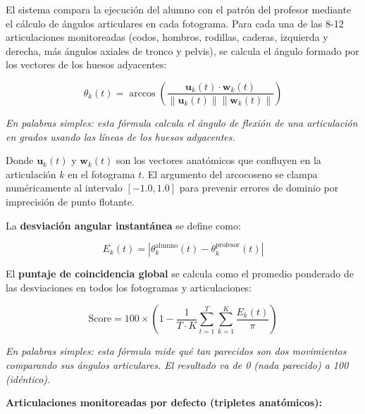 \documentclass[12pt,letterpaper]{article}
\begin{document}
El sistema compara la ejecución del alumno con el patrón del profesor mediante el cálculo de ángulos articulares en cada fotograma. Para cada una de las 8-12 articulaciones monitoreadas (codos, hombros, rodillas, caderas, izquierda y derecha, más ángulos axiales de tronco y pelvis), se calcula el ángulo formado por los vectores de los huesos adyacentes:

\[
\theta_k(t) = \arccos \left( \frac{\mathbf{u}_k(t) \cdot \mathbf{w}_k(t)}{\|\mathbf{u}_k(t)\| \|\mathbf{w}_k(t)\|} \right)
\]

\textit{En palabras simples: esta fórmula calcula el ángulo de flexión de una articulación en grados usando las líneas de los huesos adyacentes.}

Donde $\mathbf{u}_k(t)$ y $\mathbf{w}_k(t)$ son los vectores anatómicos que confluyen en la articulación $k$ en el fotograma $t$. El argumento del arcocoseno se clampa numéricamente al intervalo $[-1.0, 1.0]$ para prevenir errores de dominio por imprecisión de punto flotante.

La \textbf{desviación angular instantánea} se define como:

\[
E_k(t) = \left| \theta_k^{\text{alumno}}(t) - \theta_k^{\text{profesor}}(t) \right|
\]

El \textbf{puntaje de coincidencia global} se calcula como el promedio ponderado de las desviaciones en todos los fotogramas y articulaciones:

\[
\text{Score} = 100 \times \left( 1 - \frac{1}{T \cdot K} \sum_{t=1}^{T} \sum_{k=1}^{K} \frac{E_k(t)}{\pi} \right)
\]

\textit{En palabras simples: esta fórmula mide qué tan parecidos son dos movimientos comparando sus ángulos articulares. El resultado va de 0 (nada parecido) a 100 (idéntico).}

\textbf{Articulaciones monitoreadas por defecto (tripletes anatómicos):}
\end{document}
